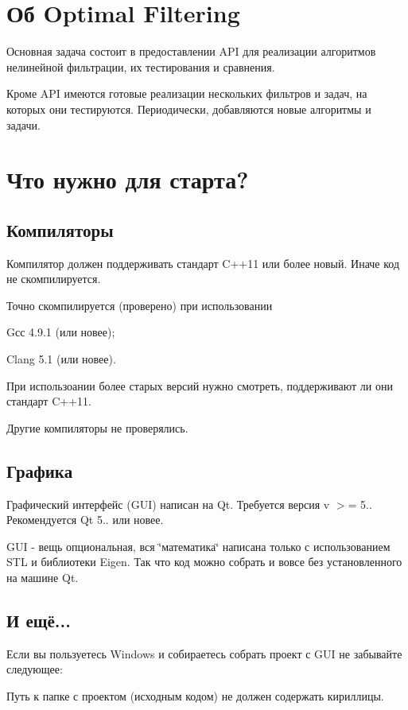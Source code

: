 \hypertarget{index_intro_sec}{}\section{Об Optimal Filtering}\label{index_intro_sec}
Основная задача состоит в предоставлении A\+PI для реализации алгоритмов нелинейной фильтрации, их тестирования и сравнения.

Кроме A\+PI имеются готовые реализации нескольких фильтров и задач, на которых они тестируются. Периодически, добавляются новые алгоритмы и задачи.\hypertarget{index_for_compile}{}\section{Что нужно для старта?}\label{index_for_compile}
\hypertarget{index_compilers}{}\subsection{Компиляторы}\label{index_compilers}
Компилятор должен поддерживать стандарт C++11 или более новый. Иначе код не скомпилируется.

Точно скомпилируется (проверено) при использовании \begin{DoxyVerb}  Gсс 4.9.1 (или новее);

  Clang 5.1 (или новее).
\end{DoxyVerb}


При использоании более старых версий нужно смотреть, поддерживают ли они стандарт C++11.

Другие компиляторы не проверялись.\hypertarget{index_gui}{}\subsection{Графика}\label{index_gui}
Графический интерфейс (G\+UI) написан на Qt. Требуется версия v $>$= 5.. Рекомендуется Qt 5.. или новее.

G\+UI -\/ вещь опциональная, вся \char`\"{}математика\char`\"{} написана только с использованием S\+TL и библиотеки Eigen. Так что код можно собрать и вовсе без установленного на машине Qt.\hypertarget{index_qt_bugs}{}\subsection{И ещё...}\label{index_qt_bugs}
Если вы пользуетесь Windows и собираетесь собрать проект с G\+UI не забывайте следующее\+:

Путь к папке с проектом (исходным кодом) не должен содержать кириллицы.

